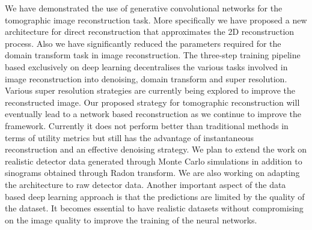 We have demonstrated the use of generative convolutional networks for the tomographic image reconstruction task. More specifically we have proposed a new architecture for direct reconstruction that approximates the \ac{2D} reconstruction process. Also we have significantly reduced the parameters required for the domain transform task in image reconstruction. The three-step training pipeline based exclusively on deep learning decentralises the various tasks involved in image reconstruction into denoising, domain transform and super resolution. Various super resolution strategies are currently being explored to improve the reconstructed image. Our proposed strategy for tomographic reconstruction will eventually lead to a network based reconstruction as we continue to improve the framework. Currently it does not perform better than traditional methods in terms of utility metrics but still has the advantage of instantaneous reconstruction and an effective denoising strategy. We plan to extend the work on realistic detector data generated through Monte Carlo simulations in addition to sinograms obtained through Radon transform. We are also working on adapting the architecture to raw detector data. Another important aspect of the data based deep learning approach is that the predictions are limited by the quality of the dataset. It becomes essential to have realistic datasets without compromising on the image quality to improve the training of the neural networks. 





